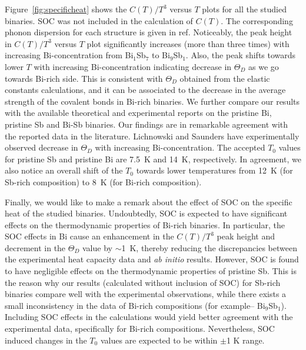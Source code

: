 \documentclass[twocolumn,superscriptaddress,nofootinbib,floatfix,aps,showpacs,prb,citeautoscript,reprint]{revtex4-1}
\begin{document}
Figure~\ref{fig:specificheat} shows the $C(T)/T^3$ versus $T$ plots for all the studied binaries. SOC was not included in the calculation of $C(T)$. The corresponding phonon dispersion for each structure is given in ref.\cite{singh2016PCCP} Noticeably, the peak height in $C(T)/T^3$ versus $T$ plot significantly increases (more than three times) with increasing Bi-concentration from Bi$_{1}$Sb$_{7}$ to Bi$_{9}$Sb$_{1}$. Also, the peak shifts towards lower $T$ with increasing Bi-concentration indicating decrease in $\Theta_{D}$ as we go towards Bi-rich side. This is consistent with $\Theta_{D}$ obtained from the elastic constants calculations, and it can be associated to the decrease in the average strength of the covalent bonds in Bi-rich binaries. We further compare our results with the available theoretical and experimental reports on the pristine Bi\cite{KeesomBi1054, CetasPRB1969, Archer1995, BiSOC_PRL2007}, pristine Sb\cite{DeSorbo1953, SbSOC_PRB2008} and Bi-Sb binaries\cite{Lichnowski1976}. Our findings are in remarkable agreement with the reported data in the literature. Lichnowski and Saunders\cite{Lichnowski1976} have experimentally observed decrease in $\Theta_{D}$ with increasing Bi-concentration. The accepted $T_{0}$ values for pristine Sb and pristine Bi are 7.5~K and 14~K, respectively. \cite{SbSOC_PRB2008, BiSOC_PRL2007} In agreement, we also notice an overall shift of the $T_{0}$ towards lower temperatures from 12~K (for Sb-rich composition) to 8~K (for Bi-rich composition).

Finally, we would like to make a remark about the effect of SOC on the specific heat of the studied binaries. Undoubtedly, SOC is expected to have significant effects on the thermodynamic properties of Bi-rich binaries. In particular, the SOC effects in Bi cause an enhancement in the $C(T)/T^3$ peak height and decrement in the $\Theta_{D}$ value by $\sim$1~K, thereby reducing the discrepancies between the experimental heat capacity data and {\it ab initio} results.\cite{BiSOC_PRL2007} However, SOC is found to have negligible effects on the thermodynamic properties of pristine Sb.\cite{SbSOC_PRB2008} This is the reason why our results (calculated without inclusion of SOC) for Sb-rich binaries compare well with the experimental observations, while there exists a small inconsistency in the data of Bi-rich compositions (for example-- Bi$_{9}$Sb$_{1}$). Including SOC effects in the calculations would yield better agreement with the experimental data, specifically for Bi-rich compositions. Nevertheless, SOC induced changes in the $T_{0}$ values are expected to be within $\pm$1 K range. 
\end{document}

